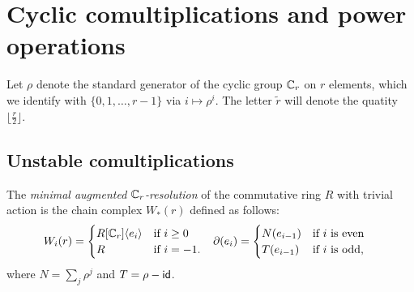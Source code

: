 

\section{Cyclic comultiplications and power operations} \label{s:2bcomultiplications}

Let $\rho$ denote the standard generator of the cyclic group $\mathbb{C}_r$ on $r$ elements, which we identify with $\{0,1,\ldots,r-1\}$ via $i\mapsto \rho^i$. The letter $\tilde{r}$ will denote the quatity $\lfloor \frac{r}{2} \rfloor$.



\subsection{Unstable comultiplications}  The \emph{minimal augmented $\mathbb{C}_r$-resolution} of the commutative ring $R$ with trivial action is the chain complex $W_*(r)$ defined as follows:
\begin{align*}
    W_i(r) &= \begin{cases}
        R[\mathbb{C}_r]\langle e_i\rangle & \text{if $i\geq 0$} \\
        R & \text{if $i=-1$}.
    \end{cases} & 
    \partial(e_i) &= \begin{cases}
        N(e_{i-1}) & \text{if $i$ is even} \\
        T(e_{i-1}) & \text{if $i$ is odd,}
    \end{cases}
\end{align*}
where $N = \sum_j \rho^j$ and $T = \rho - \mathsf{id}$. %

